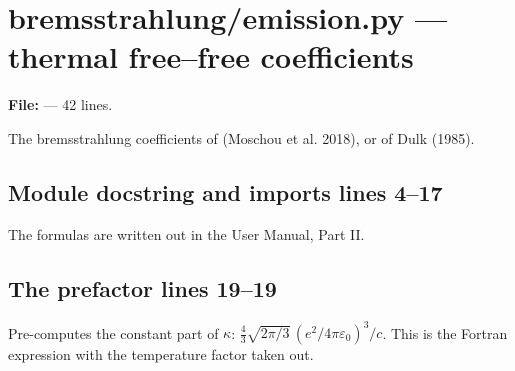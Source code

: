 \chapter{bremsstrahlung/emission.py --- thermal free--free coefficients}
\label{mod:bremsstrahlung:emission.py}
\textbf{File:}  --- 42 lines.

The bremsstrahlung coefficients of  (Moschou et al. 2018), or of
Dulk (1985).

\section*{\normalsize Module docstring and imports \hfill{\small\mdseries\color{gray}lines 4--17}}

The formulas are written out in the User Manual, Part II.

\section*{\normalsize The prefactor \hfill{\small\mdseries\color{gray}lines 19--19}}

\begin{lines}
\item[L.19] Pre-computes the constant part of $\kappa$: $\frac43\sqrt{2\pi/3}\,(e^2/4\pi\varepsilon_0)^3/c$. This is the Fortran expression  with the temperature factor taken out.
\end{lines}
